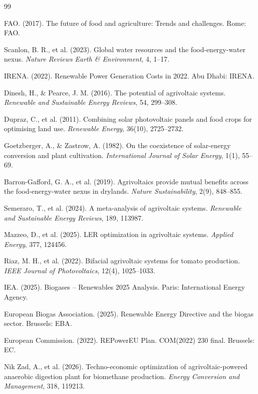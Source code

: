 \documentclass[12pt, a4paper]{article}
\begin{document}
\newpage

\begin{thebibliography}{99}

 FAO. (2017). The future of food and agriculture: Trends and challenges. Rome: FAO.

 Scanlon, B. R., et al. (2023). Global water resources and the food-energy-water nexus. \textit{Nature Reviews Earth \& Environment}, 4, 1–17.

 IRENA. (2022). Renewable Power Generation Costs in 2022. Abu Dhabi: IRENA.

 Dinesh, H., \& Pearce, J. M. (2016). The potential of agrivoltaic systems. \textit{Renewable and Sustainable Energy Reviews}, 54, 299–308.

 Dupraz, C., et al. (2011). Combining solar photovoltaic panels and food crops for optimising land use. \textit{Renewable Energy}, 36(10), 2725–2732.

 Goetzberger, A., \& Zastrow, A. (1982). On the coexistence of solar-energy conversion and plant cultivation. \textit{International Journal of Solar Energy}, 1(1), 55–69.

 Barron-Gafford, G. A., et al. (2019). Agrivoltaics provide mutual benefits across the food-energy-water nexus in drylands. \textit{Nature Sustainability}, 2(9), 848–855.

 Semeraro, T., et al. (2024). A meta-analysis of agrivoltaic systems. \textit{Renewable and Sustainable Energy Reviews}, 189, 113987.

 Mazzeo, D., et al. (2025). LER optimization in agrivoltaic systems. \textit{Applied Energy}, 377, 124456.

 Riaz, M. H., et al. (2022). Bifacial agrivoltaic systems for tomato production. \textit{IEEE Journal of Photovoltaics}, 12(4), 1025–1033.

 IEA. (2025). Biogases – Renewables 2025 Analysis. Paris: International Energy Agency.

 European Biogas Association. (2025). Renewable Energy Directive and the biogas sector. Brussels: EBA.

 European Commission. (2022). REPowerEU Plan. COM(2022) 230 final. Brussels: EC.

 Nik Zad, A., et al. (2026). Techno-economic optimization of agrivoltaic-powered anaerobic digestion plant for biomethane production. \textit{Energy Conversion and Management}, 318, 119213.


\end{thebibliography}
\end{document}

